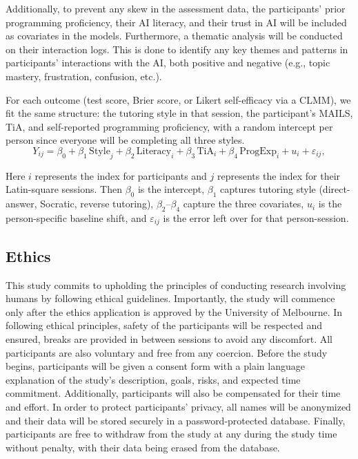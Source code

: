 \documentclass{article}
\begin{document}
Additionally, to prevent any skew in the assessment data, the participants' 
prior programming proficiency, their AI literacy, and their trust in AI will be 
included as covariates in the models. Furthermore,  
a thematic analysis will be conducted on their interaction logs. 
This is done to identify any 
key themes and patterns in participants' interactions with the AI, 
both positive and negative (e.g., topic mastery, frustration, confusion, etc.).

For each outcome (test score, Brier score, or Likert 
self-efficacy via a CLMM), we fit the same structure: the tutoring 
style in that session, the participant's MAILS, TiA, and self-reported programming proficiency, 
with a random intercept per person since everyone will be completing all three styles.
\begin{equation}
  Y_{ij}
  = \beta_0
  + \beta_1\,\mathrm{Style}_{j}
  + \beta_2\,\mathrm{Literacy}_{i}
  + \beta_3\,\mathrm{TiA}_{i}
  + \beta_4\,\mathrm{ProgExp}_{i}
  + u_i
  + \varepsilon_{ij},
  \label{eq:mixed-model}
\end{equation}

Here $i$ represents the index for participants and $j$ represents the index for their Latin-square sessions. 
Then $\beta_0$ is the intercept, $\beta_1$ captures tutoring style (direct-answer, Socratic, reverse tutoring), 
$\beta_2$--$\beta_4$ capture the three covariates, $u_i$ is the person-specific baseline shift, 
and $\varepsilon_{ij}$ is the error left over for that person-session.


\subsection{Ethics}
This study commits to upholding the principles of conducting research involving humans by 
following ethical guidelines\cite{EthicsGuide}. 
Importantly, the study will commence only after 
the ethics application is approved by the University of Melbourne. 
In following ethical principles, safety of the participants will be 
respected and ensured, breaks are provided in between sessions to avoid any discomfort. 
All participants are also voluntary and 
free from any coercion. 
Before the study begins, participants will be given a consent form with 
a plain language explanation of the study's description, goals, risks, and expected time commitment. 
Additionally, participants will also be compensated for their time and effort. 
In order to protect participants' privacy, 
all names will be anonymized and their data will be stored securely in a 
password-protected database. 
Finally, participants are free to withdraw from the study at any during the study time without penalty, with their data 
being erased from the database.
\end{document}
